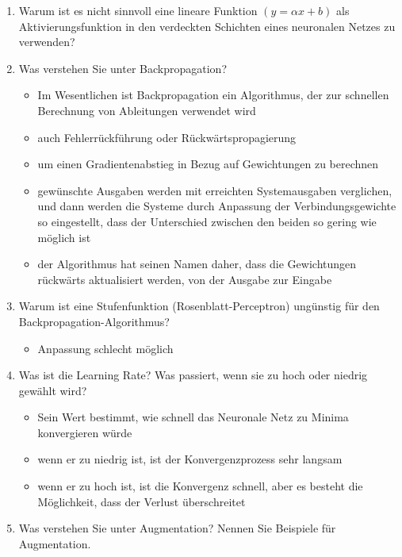 \documentclass[a4paper,10pt,titlepage]{scrartcl}
\begin{document}
\begin{enumerate}
\begin{itemize}
          \end{itemize}
    \item Warum ist es nicht sinnvoll eine lineare Funktion $(y=\alpha x+b)$ als Aktivierungsfunktion in den verdeckten Schichten eines neuronalen Netzes zu verwenden?
    \item Was verstehen Sie unter Backpropagation?
          \begin{itemize}
              \item Im Wesentlichen ist Backpropagation ein Algorithmus, der zur schnellen Berechnung von Ableitungen verwendet wird
              \item auch Fehlerrückführung oder Rückwärtspropagierung
              \item um einen Gradientenabstieg in Bezug auf Gewichtungen zu berechnen
              \item gewünschte Ausgaben werden mit erreichten Systemausgaben verglichen, und dann werden die Systeme durch Anpassung der Verbindungsgewichte so eingestellt, dass der Unterschied zwischen den beiden so gering wie möglich ist
              \item der Algorithmus hat seinen Namen daher, dass die Gewichtungen rückwärts aktualisiert werden, von der Ausgabe zur Eingabe
          \end{itemize}
    \item Warum ist eine Stufenfunktion (Rosenblatt-Perceptron) ungünstig für den Backpropagation-Algorithmus?
          \begin{itemize}
              \item Anpassung schlecht möglich
          \end{itemize}
    \item Was ist die Learning Rate? Was passiert, wenn sie zu hoch oder niedrig gewählt wird?
          \begin{itemize}
              \item Sein Wert bestimmt, wie schnell das Neuronale Netz zu Minima konvergieren würde
              \item wenn er zu niedrig ist, ist der Konvergenzprozess sehr langsam
              \item wenn er zu hoch ist, ist die Konvergenz schnell, aber es besteht die Möglichkeit, dass der Verlust überschreitet
          \end{itemize}
    \item Was verstehen Sie unter Augmentation? Nennen Sie Beispiele für Augmentation.
          \begin{itemize}

\end{itemize}
\end{enumerate}
\end{document}
